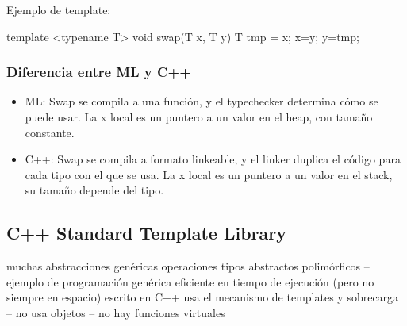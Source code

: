 \documentclass[10pt,a4paper]{report}
\begin{document}
\par Ejemplo de template:
 
template <typename T>  
void swap(T x, T y){ 
T tmp = x;  x=y;  y=tmp; 
} 


\subsubsection{Diferencia entre ML y C++}
    \begin{itemize}
        \item ML: Swap se compila a una función, y el typechecker determina cómo se puede usar. La x local es un puntero a un valor en el heap, con tamaño constante.
        \item C++: Swap se compila a formato linkeable, y el linker duplica el código para cada tipo con el que se usa. La x local es un puntero a un valor en el stack, su tamaño depende del tipo.

    \end{itemize} 

\subsection{C++ Standard Template Library}

muchas abstracciones genéricas
operaciones tipos abstractos polimórficos –  ejemplo de programación genérica
eficiente en tiempo de ejecución (pero no siempre en espacio)
escrito en C++
usa el mecanismo de templates y sobrecarga –  no usa objetos – no hay funciones 
virtuales
\end{document}
